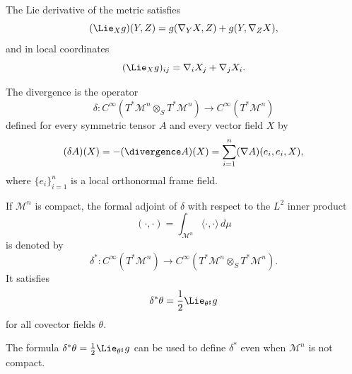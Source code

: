 \begin{remark}
\label{appa-rem-lie-derivative-metric}

The Lie derivative of the metric satisfies
\[
(\Lie_X g)(Y,Z)=g(\nabla_YX,Z)+g(Y,\nabla_ZX),
\]
and in local coordinates
\[
(\Lie_X g)_{ij}=\nabla_i X_j+\nabla_j X_i.
\]
\end{remark}

\begin{definition}
\label{appa-def-divergence-operator}


The divergence is the operator
\[
\delta : C^\infty(T^*\mathcal M^n \otimes_S T^*\mathcal M^n)\to C^\infty(T^*\mathcal M^n)
\]
defined for every symmetric tensor \(A\) and every vector field \(X\) by
\[
(\delta A)(X)=-(\divergence A)(X)=\sum_{i=1}^n (\nabla A)(e_i,e_i,X),
\]
where \(\{e_i\}_{i=1}^n\) is a local orthonormal frame field.
\end{definition}

\begin{definition}
\label{appa-def-formal-adjoint-divergence}

If \(\mathcal M^n\) is compact, the formal adjoint of \(\delta\) with respect to the \(L^2\) inner product
\[
(\cdot,\cdot)=\int_{\mathcal M^n}\langle \cdot,\cdot\rangle\,d\mu
\]
is denoted by
\[
\delta^* : C^\infty(T^*\mathcal M^n)\to C^\infty(T^*\mathcal M^n\otimes_S T^*\mathcal M^n).
\]
It satisfies
\[
\delta^*\theta=\frac12 \Lie_{\theta^\sharp}g
\]
for all covector fields \(\theta\).
\end{definition}

\begin{remark}
\label{appa-rem-extending-divergence-adjoint}

The formula \(\delta^*\theta=\tfrac12 \Lie_{\theta^\sharp}g\) can be used to define \(\delta^*\) even when \(\mathcal M^n\) is not compact.
\end{remark}

